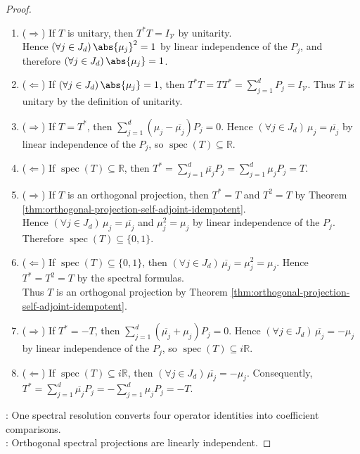 \begin{theorem}
\begin{proof}
\begin{enumerate}[label=(\roman*)]
\setlength{\itemsep}{0pt}
\item[$(i)$] ($\Rightarrow$) If $T$ is unitary, then $T^*T=I_{\mathcal{V}}$ by unitarity.\\
Hence $(\forall j\in J_d)\,\abs{\mu_j}^2=1$ by linear independence of the $P_j$, and therefore $(\forall j\in J_d)\,\abs{\mu_j}=1$.
\item[$(i)$] ($\Leftarrow$) If $(\forall j\in J_d)\,\abs{\mu_j}=1$, then $T^*T=TT^*=\sum\limits_{j=1}^{d}P_j=I_{\mathcal{V}}$. Thus $T$ is unitary by the definition of unitarity.
\item[$(ii)$] ($\Rightarrow$) If $T=T^*$, then $\sum\limits_{j=1}^{d}(\mu_j-\overline{\mu_j})P_j=0$. Hence $(\forall j\in J_d)\,\mu_j=\overline{\mu_j}$ by linear independence of the $P_j$, so $\operatorname{spec}(T)\subseteq\mathbb{R}$.
\item[$(ii)$] ($\Leftarrow$) If $\operatorname{spec}(T)\subseteq\mathbb{R}$, then $T^*=\sum\limits_{j=1}^{d}\overline{\mu_j}P_j=\sum\limits_{j=1}^{d}\mu_jP_j=T$.
\item[$(iii)$] ($\Rightarrow$) If $T$ is an orthogonal projection, then $T^*=T$ and $T^2=T$ by Theorem \ref{thm:orthogonal-projection-self-adjoint-idempotent}.\\
Hence $(\forall j\in J_d)\,\mu_j=\overline{\mu_j}$ and $\mu_j^2=\mu_j$ by linear independence of the $P_j$. Therefore $\operatorname{spec}(T)\subseteq\{0,1\}$.
\item[$(iii)$] ($\Leftarrow$) If $\operatorname{spec}(T)\subseteq\{0,1\}$, then $(\forall j\in J_d)\,\overline{\mu_j}=\mu_j^2=\mu_j$. Hence $T^*=T^2=T$ by the spectral formulas.\\
Thus $T$ is an orthogonal projection by Theorem \ref{thm:orthogonal-projection-self-adjoint-idempotent}.
\item[$(iv)$] ($\Rightarrow$) If $T^*=-T$, then $\sum\limits_{j=1}^{d}(\overline{\mu_j}+\mu_j)P_j=0$. Hence $(\forall j\in J_d)\,\overline{\mu_j}=-\mu_j$ by linear independence of the $P_j$, so $\operatorname{spec}(T)\subseteq i\mathbb{R}$.
\item[$(iv)$] ($\Leftarrow$) If $\operatorname{spec}(T)\subseteq i\mathbb{R}$, then $(\forall j\in J_d)\,\overline{\mu_j}=-\mu_j$. Consequently, $T^*=\sum\limits_{j=1}^{d}\overline{\mu_j}P_j=-\sum\limits_{j=1}^{d}\mu_jP_j=-T$.
\end{enumerate}
: One spectral resolution converts four operator identities into coefficient comparisons.\\
: Orthogonal spectral projections are linearly independent.
\end{proof}
\end{theorem}

